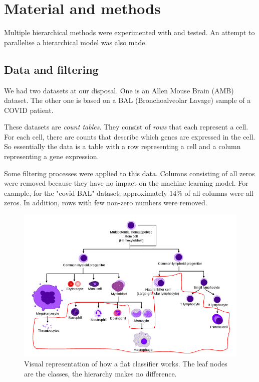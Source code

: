 \documentclass{article}
\begin{document}
\section{Material and methods}

Multiple hierarchical methods were experimented with and tested.
An attempt to parallelise a hierarchical model was also made.

\subsection{Data and filtering}

We had two datasets at our disposal.
One is an Allen Mouse Brain (AMB) dataset.
The other one is based on a BAL (Bronchoalveolar Lavage) sample of a COVID patient.

These datasets are \textit{count tables}.
They consist of \textit{rows} that each represent a cell.
For each cell, there are counts that describe which genes are expressed in the cell.
So essentially the data is a table with a row representing a cell and a column representing a gene expression.

Some filtering processes were applied to this data.
Columns consisting of all zeros were removed because they have no impact on the machine learning model.
For example, for the "covid-BAL" dataset, approximately 14\% of all columns were all zeros.
In addition, rows with few non-zero numbers were removed.

\begin{figure}[ht]
\vskip 0.2in
\begin{center}
\centerline{\includegraphics[width=\columnwidth]{images/flat.png}}
\caption{Visual representation of how a flat classifier works. The leaf nodes are the classes, the hierarchy makes no difference.}
\label{icml-historical}
\end{center}
\vskip -0.2in
\end{figure}
\end{document}
